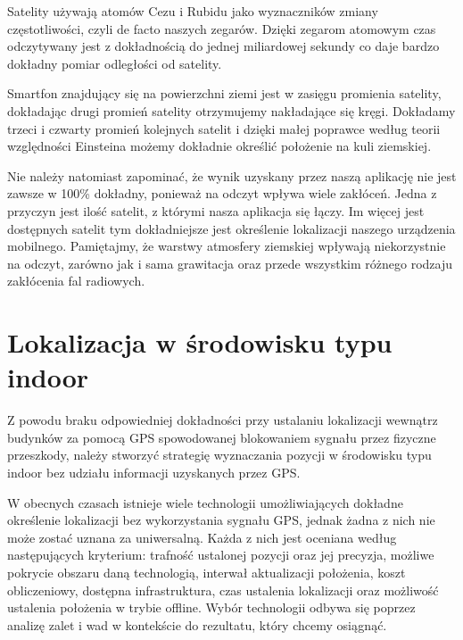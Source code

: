 \documentclass[11pt]{article}
\begin{document}
		Satelity używają atomów Cezu i Rubidu jako wyznaczników zmiany częstotliwości, czyli de facto naszych zegarów. Dzięki zegarom atomowym czas odczytywany jest z dokładnością do jednej miliardowej sekundy co daje bardzo dokładny pomiar odległości od satelity.
		
		Smartfon znajdujący się na powierzchni ziemi jest w zasięgu promienia satelity, dokładając drugi promień satelity otrzymujemy nakładające się kręgi. Dokładamy trzeci i czwarty promień kolejnych satelit i dzięki małej poprawce według teorii względności Einsteina możemy dokładnie określić położenie na kuli ziemskiej.
		
		
		Nie należy natomiast zapominać, że wynik uzyskany przez naszą aplikację nie jest zawsze w 100\% dokładny, ponieważ na odczyt wpływa wiele zakłóceń. Jedna z przyczyn jest ilość satelit, z którymi nasza aplikacja się łączy. Im więcej jest dostępnych satelit tym dokładniejsze jest określenie lokalizacji naszego urządzenia mobilnego. Pamiętajmy, że warstwy atmosfery ziemskiej wpływają niekorzystnie na odczyt, zarówno jak i sama grawitacja oraz przede wszystkim różnego rodzaju zakłócenia fal radiowych.
		
		\section{Lokalizacja w środowisku typu indoor}	 
		
		
		Z powodu braku odpowiedniej dokładności przy ustalaniu lokalizacji wewnątrz budynków za pomocą GPS spowodowanej blokowaniem sygnału przez fizyczne przeszkody,  należy stworzyć  strategię wyznaczania pozycji w środowisku typu indoor bez udziału informacji uzyskanych przez GPS.
		
		W obecnych czasach istnieje wiele technologii umożliwiających dokładne określenie lokalizacji bez wykorzystania sygnału GPS, jednak żadna z nich nie może zostać uznana za uniwersalną. Każda z nich jest oceniana według następujących kryterium: trafność ustalonej pozycji oraz jej precyzja, możliwe pokrycie obszaru daną technologią, interwał aktualizacji położenia, koszt obliczeniowy, dostępna infrastruktura, czas ustalenia lokalizacji oraz możliwość ustalenia położenia w trybie offline. Wybór technologii odbywa się poprzez analizę zalet i wad w kontekście do rezultatu, który chcemy osiągnąć.
		
\end{document}

